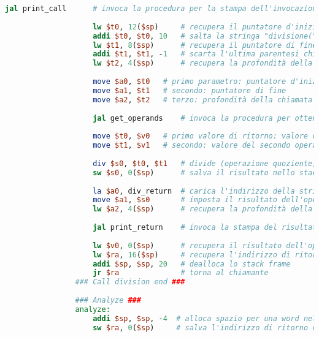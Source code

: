\begin{center}
\begin{lstlisting}[language=mips, gobble=14, stepnumber=1]
                    jal print_call      # invoca la procedura per la stampa dell'invocazione (con gli stessi parametri)
                    
                    lw $t0, 12($sp)     # recupera il puntatore d'inizio dallo stack
                    addi $t0, $t0, 10   # salta la stringa "divisione(" (10 caratteri)
                    lw $t1, 8($sp)      # recupera il puntatore di fine
                    addi $t1, $t1, -1   # scarta l'ultima parentesi chiusa
                    lw $t2, 4($sp)      # recupera la profondità della chiamata
                    
                    move $a0, $t0   # primo parametro: puntatore d'inizio
                    move $a1, $t1   # secondo: puntatore di fine
                    move $a2, $t2   # terzo: profondità della chiamata
                    
                    jal get_operands    # invoca la procedura per ottenere gli operandi
                    
                    move $t0, $v0   # primo valore di ritorno: valore del primo operando
                    move $t1, $v1   # secondo: valore del secondo operando
                    
                    div $s0, $t0, $t1   # divide (operazione quoziente) il primo operando per il secondo
                    sw $s0, 0($sp)      # salva il risultato nello stack
                    
                    la $a0, div_return  # carica l'indirizzo della stringa div_return (primo parametro)
                    move $a1, $s0       # imposta il risultato dell'operazione come secondo parametro
                    lw $a2, 4($sp)      # recupera la profondità della chiamata (terzo parametro)
                    
                    jal print_return    # invoca la stampa del risultato con questi tre parametri
                    
                    lw $v0, 0($sp)      # recupera il risultato dell'operazione
                    lw $ra, 16($sp)     # recupera l'indirizzo di ritorno
                    addi $sp, $sp, 20   # dealloca lo stack frame
                    jr $ra              # torna al chiamante
                ### Call division end ###
                    
                ### Analyze ###
                analyze:
                    addi $sp, $sp, -4  # alloca spazio per una word nello stack frame
                    sw $ra, 0($sp)     # salva l'indirizzo di ritorno del chiamante
                

\end{lstlisting}
\end{center}
